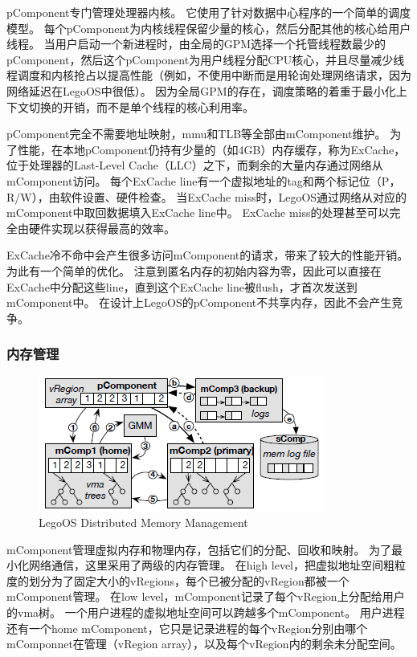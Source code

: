 pComponent专门管理处理器内核。
它使用了针对数据中心程序的一个简单的调度模型。
每个pComponent为内核线程保留少量的核心，然后分配其他的核心给用户线程。
当用户启动一个新进程时，由全局的GPM选择一个托管线程数最少的pComponent，然后这个pComponent为用户线程分配CPU核心，并且尽量减少线程调度和内核抢占以提高性能（例如，不使用中断而是用轮询处理网络请求，因为网络延迟在LegoOS中很低）。
因为全局GPM的存在，调度策略的着重于最小化上下文切换的开销，而不是单个线程的核心利用率。

pComponent完全不需要地址映射，mmu和TLB等全部由mComponent维护。
为了性能，在本地pComponent仍持有少量的（如4GB）内存缓存，称为ExCache，位于处理器的Last-Level Cache（LLC）之下，而剩余的大量内存通过网络从mComponent访问。
每个ExCache line有一个虚拟地址的tag和两个标记位（P，R/W），由软件设置、硬件检查。
当ExCache miss时，LegoOS通过网络从对应的mComponent中取回数据填入ExCache line中。
ExCache miss的处理甚至可以完全由硬件实现以获得最高的效率。

ExCache冷不命中会产生很多访问mComponent的请求，带来了较大的性能开销。
为此有一个简单的优化。
注意到匿名内存的初始内容为零，因此可以直接在ExCache中分配这些line，直到这个ExCache line被flush，才首次发送到mComponent中。
在设计上LegoOS的pComponent不共享内存，因此不会产生竞争。

\subsubsection{内存管理}

\begin{figure}[h]
\centering
\includegraphics[scale=1.00]{Figures/system/memory_management.png}
\decoRule
\caption{LegoOS Distributed Memory Management}
\label{fig:legoos_memory_management}
\end{figure}

mComponent管理虚拟内存和物理内存，包括它们的分配、回收和映射。
为了最小化网络通信，这里采用了两级的内存管理。
在high level，把虚拟地址空间粗粒度的划分为了固定大小的vRegions，每个已被分配的vRegion都被一个mComponent管理。
在low level，mComponent记录了每个vRegion上分配给用户的vma树。
一个用户进程的虚拟地址空间可以跨越多个mComponent。
用户进程还有一个home mComponent，它只是记录进程的每个vRegion分别由哪个mComponnet在管理（vRegion array），以及每个vRegion内的剩余未分配空间。

